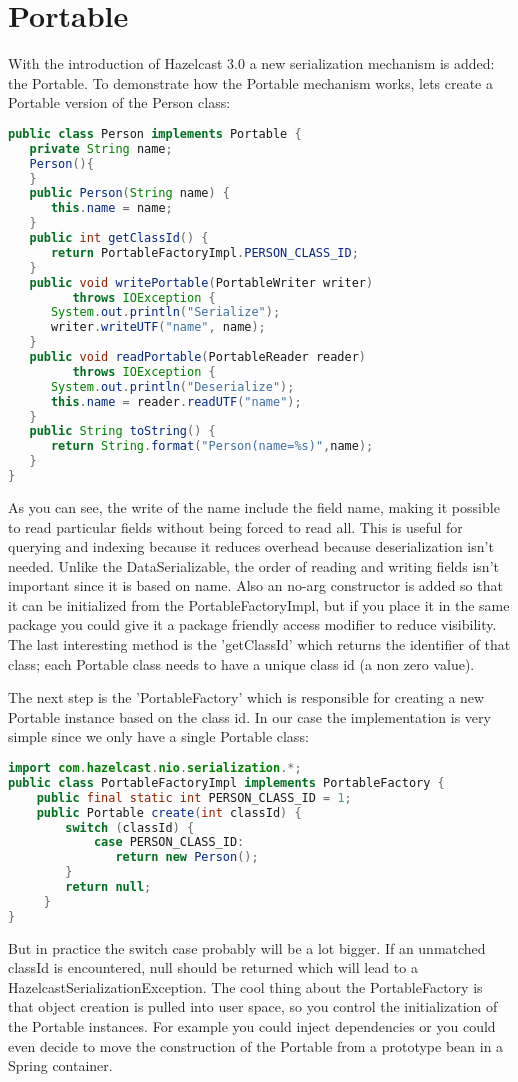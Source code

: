 \section{Portable}
With the introduction of Hazelcast 3.0 a new serialization mechanism is added: the Portable. To demonstrate how the Portable mechanism works, lets create a Portable version of the Person class:
\begin{lstlisting}[language=java]
public class Person implements Portable {
   private String name;
   Person(){
   }
   public Person(String name) {
      this.name = name;
   }
   public int getClassId() {
      return PortableFactoryImpl.PERSON_CLASS_ID;
   }
   public void writePortable(PortableWriter writer) 
         throws IOException {
      System.out.println("Serialize");
      writer.writeUTF("name", name);
   }
   public void readPortable(PortableReader reader) 
         throws IOException {
      System.out.println("Deserialize");
      this.name = reader.readUTF("name");
   }
   public String toString() {
      return String.format("Person(name=%s)",name);
   }
}
\end{lstlisting}
As you can see, the write of the name include the field name, making it possible to read particular fields without being forced to read all. This is useful for querying and indexing because it reduces overhead because deserialization isn't needed. Unlike the DataSerializable, the order of reading and writing fields isn't important since it is based on name. Also an no-arg constructor is added so that it can be initialized from the PortableFactoryImpl, but if you place it in the same package you could give it a package friendly access modifier to reduce visibility. The last interesting method is the 'getClassId' which returns the identifier of that class; each Portable class needs to have a unique class id (a non zero value).

The next step is the 'PortableFactory' which is responsible for creating a new Portable instance based on the class id. In our case the implementation is very simple since we only have a single Portable class:
\begin{lstlisting}[language=java]
import com.hazelcast.nio.serialization.*;
public class PortableFactoryImpl implements PortableFactory {
    public final static int PERSON_CLASS_ID = 1;
    public Portable create(int classId) {
        switch (classId) {
            case PERSON_CLASS_ID: 
               return new Person();
        }
        return null;
     }
}
\end{lstlisting}
But in practice the switch case probably will be a lot bigger. If an unmatched classId is encountered, null should be returned which will lead to a HazelcastSerializationException. The cool thing about the PortableFactory is that object creation is pulled into user space, so you control the initialization of the Portable instances. For example you could inject dependencies or you could even decide to move the construction of the Portable from a prototype bean in a Spring container. 

